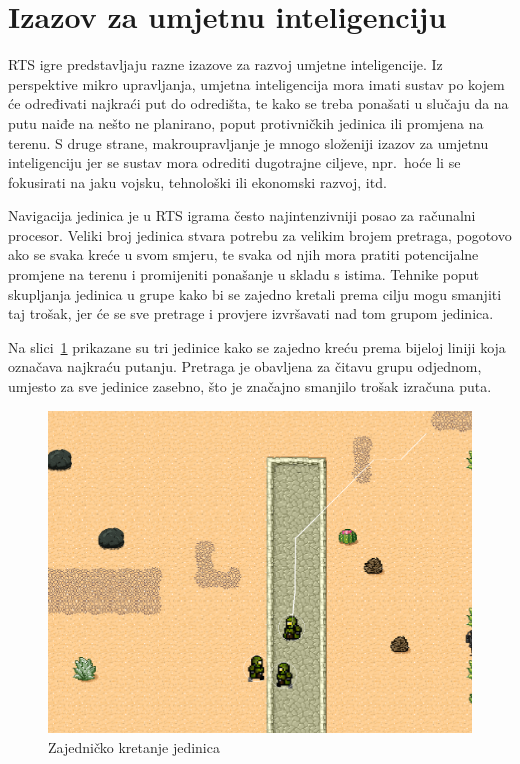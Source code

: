 \documentclass[times, utf8, zavrsni, numeric]{fer}
\begin{document}
\section{Izazov za umjetnu inteligenciju}

\par RTS igre predstavljaju razne izazove za razvoj umjetne inteligencije. 
Iz perspektive mikro upravljanja, umjetna inteligencija mora imati sustav po kojem će određivati najkraći put do odredišta, te kako se treba ponašati u slučaju da na putu naiđe na nešto ne planirano, poput protivničkih jedinica ili promjena na terenu. 
S druge strane, makroupravljanje je mnogo složeniji izazov za umjetnu inteligenciju jer se sustav mora odrediti dugotrajne ciljeve, npr.\ hoće li se fokusirati na jaku vojsku, tehnološki ili ekonomski razvoj, itd.

\par Navigacija jedinica je u RTS igrama često najintenzivniji posao za računalni procesor.
Veliki broj jedinica stvara potrebu za velikim brojem pretraga, pogotovo ako se svaka kreće u svom smjeru, te svaka od njih mora pratiti potencijalne promjene na terenu i promijeniti ponašanje u skladu s istima.
Tehnike poput skupljanja jedinica u grupe kako bi se zajedno kretali prema cilju mogu smanjiti taj trošak, jer će se sve pretrage i provjere izvršavati nad tom grupom jedinica\cite{book:AIGameProgrammingWisdom}. 

\par Na slici~\ref{fig:RTSgrouping} prikazane su tri jedinice kako se zajedno kreću prema bijeloj liniji koja označava najkraću putanju.
Pretraga je obavljena za čitavu grupu odjednom, umjesto za sve jedinice zasebno, što je značajno smanjilo trošak izračuna puta.

\begin{figure}[h] 
	\centering
	\includegraphics[width=0.6\linewidth]{images/RTSgrouping.png}
	\caption{Zajedničko kretanje jedinica}
	\label{fig:RTSgrouping}
\end{figure} 
\end{document}
